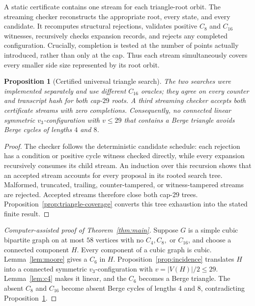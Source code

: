 \documentclass[11pt]{article}
\newtheorem{proposition}[theorem]{Proposition}
\theoremstyle{definition}
\begin{document}


A static certificate contains one stream for each triangle-root orbit. The
streaming checker reconstructs the appropriate root, every state, and every
candidate. It recomputes structural
rejections, validates positive \(C_8\) and \(C_{16}\) witnesses, recursively
checks expansion records, and rejects any completed configuration. Crucially,
completion is tested at the number of points actually introduced, rather
than only at the cap. Thus each stream simultaneously covers every smaller
side size represented by its root orbit.

\begin{proposition}[Certified universal triangle search]
\label{prop:triangle-search}
The two searches were implemented separately and use different \(C_{16}\)
oracles; they agree on every counter and transcript hash for both cap-\(29\)
roots. A third streaming checker accepts both certificate streams with zero
completions. Consequently, no connected linear symmetric
\(v_3\)-configuration with \(v\leq29\) that
contains a Berge triangle avoids Berge cycles of lengths \(4\) and \(8\).
\end{proposition}

\begin{proof}
The checker follows the deterministic candidate schedule: each
rejection has a condition or positive cycle witness checked directly, while
every expansion recursively consumes its child stream. An induction
over this recursion shows that an accepted stream accounts for every proposal
in its rooted search tree. Malformed, truncated, trailing, counter-tampered,
or witness-tampered streams are rejected. Accepted streams therefore close
both cap-\(29\) trees. Proposition~\ref{prop:triangle-coverage} converts this
tree exhaustion into the stated finite result.
\end{proof}

\begin{proof}[Computer-assisted proof of Theorem~\ref{thm:main}]
Suppose \(G\) is a simple cubic bipartite graph on at most \(58\) vertices
with no \(C_4,C_8,\) or \(C_{16}\), and choose a connected component \(H\).
Every component of a cubic graph is cubic. Lemma~\ref{lem:moore} gives a
\(C_6\) in \(H\). Proposition~\ref{prop:incidence} translates \(H\) into a
connected symmetric \(v_3\)-configuration with
\(v=|V(H)|/2\leq29\). Lemma~\ref{lem:c4} makes it linear, and the \(C_6\)
becomes a Berge triangle. The absent \(C_8\) and \(C_{16}\) become absent
Berge cycles of lengths \(4\) and \(8\), contradicting
Proposition~\ref{prop:triangle-search}.
\end{proof}
\end{document}
